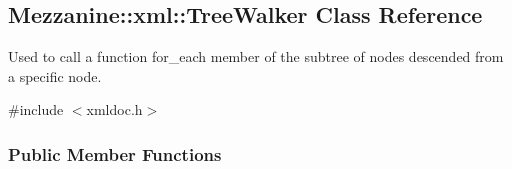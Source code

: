 \hypertarget{classMezzanine_1_1xml_1_1TreeWalker}{
\subsection{Mezzanine::xml::TreeWalker Class Reference}
\label{classMezzanine_1_1xml_1_1TreeWalker}
}


Used to call a function for\_\-each member of the subtree of nodes descended from a specific node.  




{\ttfamily \#include $<$xmldoc.h$>$}

\subsubsection*{Public Member Functions}
